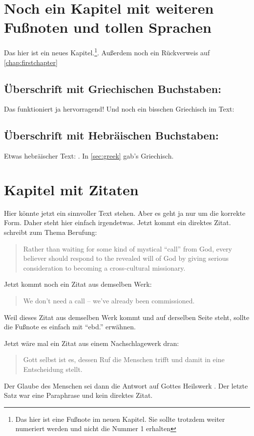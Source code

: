 \documentclass{scrreport}
\begin{document}
\chapter{Noch ein Kapitel mit weiteren Fußnoten und tollen Sprachen}
Das hier ist ein neues Kapitel.\footnote{Das hier ist eine Fußnote im neuen Kapitel. Sie sollte trotzdem weiter numeriert werden und nicht die Nummer 1 erhalten}. Außerdem noch ein Rückverweis auf \autoref{chap:firstchapter}

\section{Überschrift mit Griechischen Buchstaben: }
\label{sec:greek}
Das funktioniert ja hervorragend! Und noch ein bisschen Griechisch im Text: 

\section{Überschrift mit Hebräischen Buchstaben: }
Etwas hebräischer Text: . In \autoref{sec:greek} gab's Griechisch.

\chapter{Kapitel mit Zitaten}
Hier könnte jetzt ein sinnvoller Text stehen. Aber es geht ja nur um die korrekte Form. Daher steht hier einfach irgendetwas. Jetzt kommt ein direktes Zitat. \citeauthor*{friesen} schreibt zum Thema Berufung: \blockcquote[][330]{friesen}{Rather than waiting for some kind of mystical \enquote{call} from God, every believer should respond to the revealed will of God by giving serious consideration to becoming a cross-cultural missionary.} Jetzt kommt noch ein Zitat aus demselben Werk: \blockcquote[][330]{friesen}{We don't need a call -- we've already been commissioned.} Weil dieses Zitat aus demselben Werk kommt und auf derselben Seite steht, sollte die Fußnote es einfach mit \enquote{ebd.} erwähnen.

Jetzt wäre mal ein Zitat aus einem Nachschlagewerk dran: \blockcquote[][80]{rienecker}{Gott selbst ist es, dessen Ruf die Menschen trifft und damit in eine Entscheidung stellt.} Der Glaube des Menschen sei dann die Antwort auf Gottes Heilswerk \autocite[Vgl.][]{rienecker}. Der letzte Satz war eine Paraphrase und kein direktes Zitat.
\end{document}
